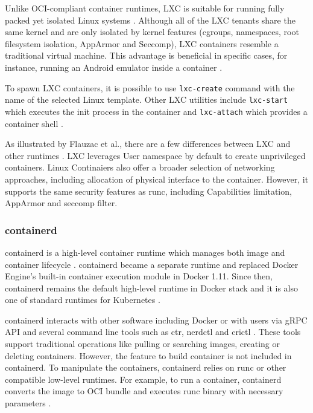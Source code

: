 Unlike OCI-compliant container runtimes, LXC is suitable for running fully packed yet isolated Linux systems \cite{b:lxc}. Although all of the LXC tenants share the same kernel and are only isolated by kernel features (cgroups, namespaces, root filesystem isolation, AppArmor and Seccomp), LXC containers resemble a traditional virtual machine. This advantage is beneficial in specific cases, for instance, running an Android emulator inside a container \cite{c:8}.

To spawn LXC containers, it is possible to use \texttt{lxc-create} command with the name of the selected Linux template. Other LXC utilities include \texttt{lxc-start} which executes the init process in the container and \texttt{lxc-attach} which provides a container shell \cite{m:lxc}.

As illustrated by Flauzac et al., there are a few differences between LXC and other runtimes \cite{pcs:1}. LXC leverages User namespace by default to create unprivileged containers. Linux Continaiers also offer a broader selection of networking approaches, including allocation of physical interface to the container. However, it supports the same security features as runc, including Capabilities limitation, AppArmor and seccomp filter.

\subsubsection*{containerd}

containerd is a high-level container runtime which manages both image and container lifecycle \cite{b:ianlewis3}. containerd became a separate runtime and replaced Docker Engine's built-in container execution module in Docker 1.11. Since then, containerd remains the default high-level runtime in Docker stack and it is also one of standard runtimes for Kubernetes \cite{book:kube}.

containerd interacts with other software including Docker or with users via gRPC API and several command line tools such as ctr, nerdctl and crictl \cite{d:getting-started}. These tools support traditional operations like pulling or searching images, creating or deleting containers. However, the feature to build container is not included in containerd. To manipulate the containers, containerd relies on runc or other compatible low-level runtimes. For example, to run a container, containerd converts the image to OCI bundle and executes runc binary with necessary parameters \cite{c:4}.

